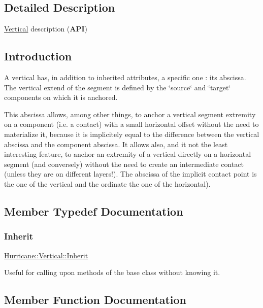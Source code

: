 \subsection{Detailed Description}
\hyperlink{classHurricane_1_1Vertical}{Vertical} description ({\bfseries A\+PI}) 

\hypertarget{classHurricane_1_1Vertical_secVerticalIntro}{}\subsection{Introduction}\label{classHurricane_1_1Vertical_secVerticalIntro}
A vertical has, in addition to inherited attributes, a specific one \+: its abscissa. The vertical extend of the segment is defined by the \char`\"{}source\char`\"{} and \char`\"{}target\char`\"{} components on which it is anchored.

This abscissa allows, among other things, to anchor a vertical segment extremity on a component (i.\+e. a contact) with a small horizontal offset without the need to materialize it, because it is implicitely equal to the difference between the vertical abscissa and the component abscissa. It allows also, and it not the least interesting feature, to anchor an extremity of a vertical directly on a horizontal segment (and conversely) without the need to create an intermediate contact (unless they are on different layers!). The abscissa of the implicit contact point is the one of the vertical and the ordinate the one of the horizontal). 

\subsection{Member Typedef Documentation}
\mbox{\label{classHurricane_1_1Vertical_a0132a4151899b356b157562c792294fd}} 
\subsubsection{\texorpdfstring{Inherit}{Inherit}}
{\footnotesize\ttfamily \hyperlink{classHurricane_1_1Vertical_a0132a4151899b356b157562c792294fd}{Hurricane\+::\+Vertical\+::\+Inherit}}

Useful for calling upon methods of the base class without knowing it. 

\subsection{Member Function Documentation}
\mbox{\label{classHurricane_1_1Vertical_a1ff223aa8f0b9ffe3aefc5e3ade6d34a}} 
